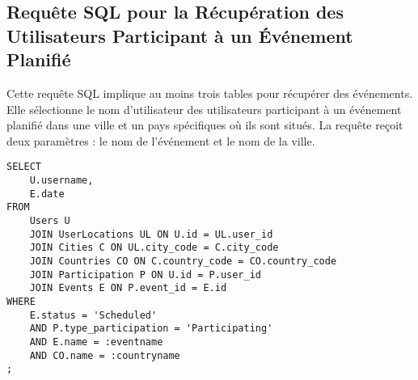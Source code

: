 \subsection{Requête SQL pour la Récupération des Utilisateurs Participant à un Événement Planifié}

Cette requête SQL implique au moins trois tables pour récupérer des événements. Elle sélectionne le nom d'utilisateur des utilisateurs participant à un événement planifié dans une ville et un pays spécifiques où ils sont situés. La requête reçoit deux paramètres : le nom de l'événement et le nom de la ville.

\begin{lstlisting}
SELECT
    U.username,
    E.date
FROM
    Users U
    JOIN UserLocations UL ON U.id = UL.user_id
    JOIN Cities C ON UL.city_code = C.city_code
    JOIN Countries CO ON C.country_code = CO.country_code
    JOIN Participation P ON U.id = P.user_id
    JOIN Events E ON P.event_id = E.id
WHERE
    E.status = 'Scheduled'
    AND P.type_participation = 'Participating'
    AND E.name = :eventname
    AND CO.name = :countryname
;
\end{lstlisting}